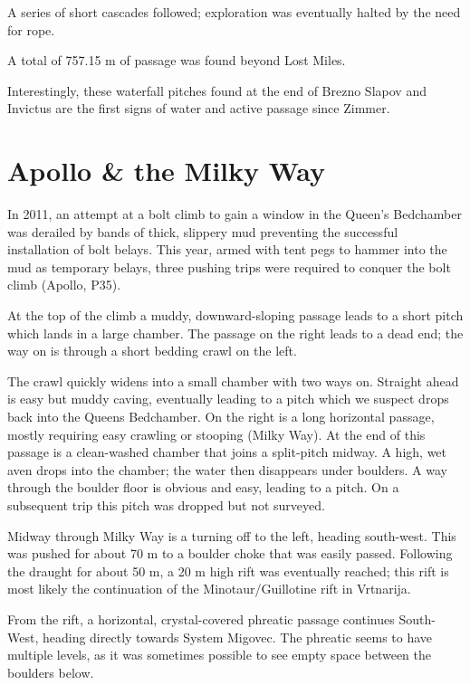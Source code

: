A series of short cascades followed; exploration was eventually halted
by the need for rope.

A total of 757.15 m of passage was found beyond Lost Miles.

Interestingly, these waterfall pitches found at the end of Brezno Slapov
and Invictus are the first signs of water and active passage since
Zimmer.

\hypertarget{apollo-the-milky-way}{%
\section{Apollo \& the Milky Way}\label{apollo-the-milky-way}}

In 2011, an attempt at a bolt climb to gain a window in the Queen's
Bedchamber was derailed by bands of thick, slippery mud preventing the
successful installation of bolt belays. This year, armed with tent pegs
to hammer into the mud as temporary belays, three pushing trips were
required to conquer the bolt climb (Apollo, P35).

At the top of the climb a muddy, downward-sloping passage leads to a
short pitch which lands in a large chamber. The passage on the right
leads to a dead end; the way on is through a short bedding crawl on the
left.

The crawl quickly widens into a small chamber with two ways on. Straight
ahead is easy but muddy caving, eventually leading to a pitch which we
suspect drops back into the Queens Bedchamber. On the right is a long
horizontal passage, mostly requiring easy crawling or stooping (Milky
Way). At the end of this passage is a clean-washed chamber that joins a
split-pitch midway. A high, wet aven drops into the chamber; the water
then disappears under boulders. A way through the boulder floor is
obvious and easy, leading to a pitch. On a subsequent trip this pitch
was dropped but not surveyed.

Midway through Milky Way is a turning off to the left, heading
south-west. This was pushed for about 70 m to a boulder choke that was
easily passed. Following the draught for about 50 m, a 20 m high rift
was eventually reached; this rift is most likely the continuation of the
Minotaur/Guillotine rift in Vrtnarija.

From the rift, a horizontal, crystal-covered phreatic passage continues
South-West, heading directly towards System Migovec. The phreatic seems
to have multiple levels, as it was sometimes possible to see empty space
between the boulders below.

